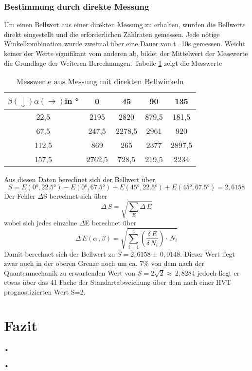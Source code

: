 \documentclass[twoside,colorback,accentcolor=tud4c,11pt]{tudreport}
\begin{document}
\subsection{Bestimmung durch direkte Messung}
Um einen Bellwert aus einer direkten Messung zu erhalten, wurden die Bellwerte direkt eingestellt und die erforderlichen Zählraten gemessen. Jede nötige Winkelkombination wurde zweimal über eine Dauer von t=10s gemessen. Weicht keiner der Werte signifikant vom anderen ab, bildet der Mittelwert der Messwerte die Grundlage der Weiteren Berechnungen. Tabelle \ref{bellwerte} zeigt die Messwerte
\begin{table}[H]\label{bellwerte}
\renewcommand*{\arraystretch}{1.2}
\centering
\begin{tabular}{|c|c|c|c|c|}
\hline 
$\beta(\downarrow)\alpha(\rightarrow)$in ° & 0 & 45 & 90 & 135 \\ 
\hline 
22,5 & 2195 & 2820 & 879,5 & 181,5 \\ 
\hline 
67,5 & 247,5 & 2278,5 & 2961 & 920 \\ 
\hline 
112,5 & 869 & 265 & 2377 & 2897,5 \\ 
\hline 
157,5 & 2762,5 & 728,5 & 219,5 & 2234 \\ 
\hline 
\end{tabular} 
\caption{Messwerte aus Messung mit direkten Bellwinkeln}
\end{table}
Aus diesen Daten berechnet sich der Bellwert über 
\begin{equation}
S=E(0°,22.5°)-E(0°,67.5°)+E(45°,22.5°)+E(45°,67.5°)=2,6158
\end{equation}
Der Fehler $\Delta$S berechnet sich über
\begin{equation}
\Delta\,S=\sqrt{\sum_{E}\Delta\,E}
\end{equation}
wobei sich jedes einzelne $\Delta$E berechnet über
\begin{equation}
\Delta\,E(\alpha\,,\beta)=\sqrt{\sum_{i=1}^4\left(\frac{\delta\,E}{\delta\,N_{i}}\right)\cdot\,N_{i}}
\end{equation}
Damit berechnet sich der Bellwert zu $S=2,6158\pm\,0,0148$. Dieser Wert liegt zwar auch in der oberen Grenze noch um ca. 7\% von dem nach der Quantenmechanik zu erwartenden Wert von $S=2\sqrt{2}\approx\,2,8284$ jedoch liegt er etwas über das 41 Fache der Standartabweichung über dem nach einer HVT prognostizierten Wert S=2.
\chapter{Fazit}	
•
\renewcommand{\bibname}{Literatur}
\begin{thebibliography}{0}
•
\end{thebibliography}
\end{document}
